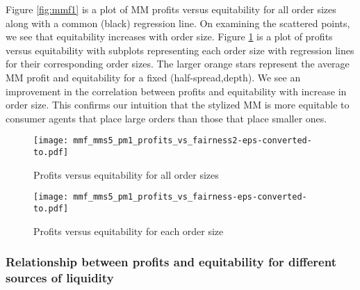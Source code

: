 \documentclass[sigconf]{acmart}
\begin{document}
Figure \ref{fig:mmf1} is a plot of MM profits versus equitability for all order sizes along with a common (black) regression line. On examining the scattered points, we see that equitability increases with order size. Figure \ref{fig:mmf2} is a plot of profits versus equitability with subplots representing each order size with regression lines for their corresponding order sizes. The larger orange stars represent the average MM profit and equitability for a fixed (half-spread,depth). We see an improvement in the correlation between profits and equitability with increase in order size. This confirms our intuition that the stylized MM is more equitable to consumer agents that place large orders than those that place smaller ones.
\begin{figure}[h]
    \centering
    \texttt{[image: mmf\_mms5\_pm1\_profits\_vs\_fairness2-eps-converted-to.pdf]}
    \caption{Profits versus equitability for all order sizes}
    \label{fig:mmf1}
    \texttt{[image: mmf\_mms5\_pm1\_profits\_vs\_fairness-eps-converted-to.pdf]}
    \caption{Profits versus equitability for each order size}
    \label{fig:mmf2}
\end{figure}


\subsubsection{Relationship between profits and equitability for different sources of liquidity}
\end{document}
